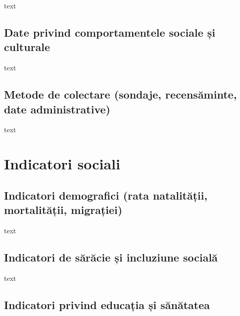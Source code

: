\documentclass[
  11pt,
  b5paper,
  nottoc]{book}
\begin{document}
text

\hypertarget{date-privind-comportamentele-sociale-ux219i-culturale}{%
\subsection{Date privind comportamentele sociale și
culturale}\label{date-privind-comportamentele-sociale-ux219i-culturale}}

text

\hypertarget{metode-de-colectare-sondaje-recensux103minte-date-administrative}{%
\subsection{Metode de colectare (sondaje, recensăminte, date
administrative)}\label{metode-de-colectare-sondaje-recensux103minte-date-administrative}}

text

\hypertarget{indicatori-sociali}{%
\section{Indicatori sociali}\label{indicatori-sociali}}

\hypertarget{indicatori-demografici-rata-natalitux103ux21bii-mortalitux103ux21bii-migraux21biei}{%
\subsection{Indicatori demografici (rata natalității, mortalității,
migrației)}\label{indicatori-demografici-rata-natalitux103ux21bii-mortalitux103ux21bii-migraux21biei}}

text

\hypertarget{indicatori-de-sux103rux103cie-ux219i-incluziune-socialux103}{%
\subsection{Indicatori de sărăcie și incluziune
socială}\label{indicatori-de-sux103rux103cie-ux219i-incluziune-socialux103}}

text

\hypertarget{indicatori-privind-educaux21bia-ux219i-sux103nux103tatea}{%
\subsection{Indicatori privind educația și
sănătatea}\label{indicatori-privind-educaux21bia-ux219i-sux103nux103tatea}}
\end{document}
